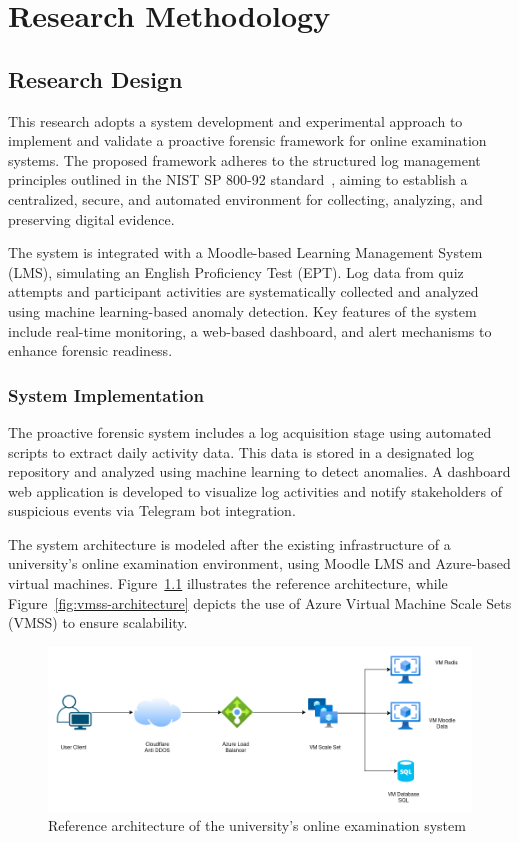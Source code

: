 \chapter{Research Methodology}

\section{Research Design}

This research adopts a system development and experimental approach to implement and validate a proactive forensic framework for online examination systems. The proposed framework adheres to the structured log management principles outlined in the NIST SP 800-92 standard~\cite{kentnist800922006guide}, aiming to establish a centralized, secure, and automated environment for collecting, analyzing, and preserving digital evidence.

The system is integrated with a Moodle-based Learning Management System (LMS), simulating an English Proficiency Test (EPT). Log data from quiz attempts and participant activities are systematically collected and analyzed using machine learning-based anomaly detection. Key features of the system include real-time monitoring, a web-based dashboard, and alert mechanisms to enhance forensic readiness.

\subsection{System Implementation}

The proactive forensic system includes a log acquisition stage using automated scripts to extract daily activity data. This data is stored in a designated log repository and analyzed using machine learning to detect anomalies. A dashboard web application is developed to visualize log activities and notify stakeholders of suspicious events via Telegram bot integration.

The system architecture is modeled after the existing infrastructure of a university’s online examination environment, using Moodle LMS and Azure-based virtual machines. Figure~\ref{fig:lms-architecture} illustrates the reference architecture, while Figure~\ref{fig:vmss-architecture} depicts the use of Azure Virtual Machine Scale Sets (VMSS) to ensure scalability.

\begin{figure}[H]
    \centering
    \includegraphics[width=14cm]{figure/architecture-lac-architecture LAC level 1.drawio.png}
    \caption{Reference architecture of the university’s online examination system}
    \label{fig:lms-architecture}
\end{figure}

